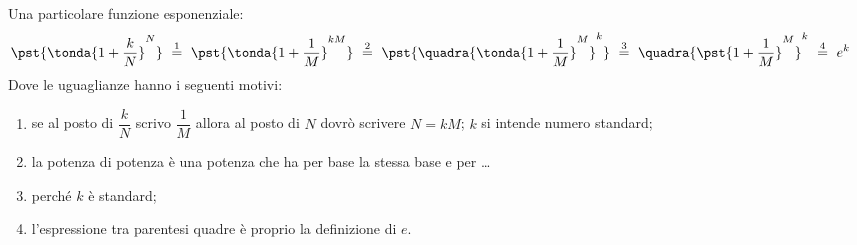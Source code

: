 \begin{esempio}
Una particolare funzione esponenziale:
\begin{align*}
 &\pst{\tonda{1+\dfrac{k}{N}}^N}
~ \stackrel{1}{=} ~  
\pst{\tonda{1+\dfrac{1}{M}}^{kM}}
~ \stackrel{2}{=} ~
\pst{\quadra{\tonda{1+\dfrac{1}{M}}^M}^k}
~ \stackrel{3}{=} ~ {\quadra{\pst{1+\dfrac{1}{M}}^M}^k}
~ \stackrel{4}{=} ~ e^k
\end{align*}
Dove le uguaglianze hanno i seguenti motivi:
\begin{enumerate} [nosep]
 \item se al posto di \(\dfrac{k}{N}\) scrivo \(\dfrac{1}{M}\) 
allora al posto di \(N\) dovrò scrivere \(N=kM\); $k$ si intende numero standard;
 \item la potenza di potenza è una potenza che ha per base la stessa base 
e per \dots
 \item perché $k$ è standard;
 \item l'espressione tra parentesi quadre è proprio la definizione di \(e\).
\end{enumerate}
\end{esempio}

